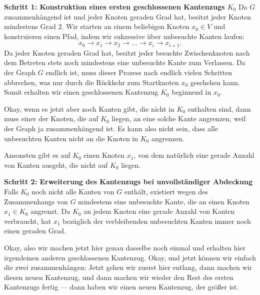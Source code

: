 \begin{math-stroke}
\begin{short-proof}
\textbf{Schritt 1: Konstruktion eines ersten geschlossenen Kantenzugs $K_0$}
Da $G$ zusammenhängend ist und jeder Knoten geraden Grad hat, besitzt jeder Knoten mindestens Grad $2$. Wir starten an einem beliebigen Knoten $x_0 \in V$ und konstruieren einen Pfad, indem wir sukzessive über unbesuchte Kanten laufen: 
\[
x_0 \to x_1 \to x_2 \to \dots \to x_i \to x_{i+1}.
\]
Da jeder Knoten geraden Grad hat, besitzt jeder besuchte Zwischenknoten nach dem Betreten stets noch mindestens eine unbesuchte Kante zum Verlassen. Da der Graph $G$ endlich ist, muss dieser Prozess nach endlich vielen Schritten abbrechen, was nur durch die Rückkehr zum Startknoten $x_0$ geschehen kann. Somit erhalten wir einen geschlossenen Kantenzug $K_0$ beginnend in $x_0$.
\end{short-proof}
\end{math-stroke}

\begin{spoken-clean}[00:11:00 - 00:13:30]
Okay, wenn es jetzt aber noch Kanten gibt, die nicht in $K_0$ enthalten sind, dann muss einer der Knoten, die auf $K_0$ liegen, an eine solche Kante angrenzen, weil der Graph ja zusammenhängend ist. Es kann also nicht sein, dass alle unbesuchten Kanten nicht an die Knoten in $K_0$ angrenzen.

Ansonsten gibt es auf $K_0$ einen Knoten $x_1$, von dem natürlich eine gerade Anzahl von Kanten ausgeht, die nicht auf $K_0$ liegen. 
\end{spoken-clean}

\begin{math-stroke}
\begin{short-proof}
\textbf{Schritt 2: Erweiterung des Kantenzugs bei unvollständiger Abdeckung}
Falls $K_0$ noch nicht alle Kanten von $G$ enthält, existiert wegen des Zusammenhangs von $G$ mindestens eine unbesuchte Kante, die an einen Knoten $x_1 \in K_0$ angrenzt. Da $K_0$ an jedem Knoten eine gerade Anzahl von Kanten verbraucht, hat $x_1$ bezüglich der verbleibenden unbesuchten Kanten immer noch einen geraden Grad.
\end{short-proof}
\end{math-stroke}

\begin{spoken-clean}[00:13:30 - 00:15:10]
Okay, also wir machen jetzt hier genau dasselbe noch einmal und erhalten hier irgendeinen anderen geschlossenen Kantenzug. Okay, und jetzt können wir einfach die zwei zusammenhängen: Jetzt gehen wir zuerst hier entlang, dann machen wir diesen neuen Kantenzug, und dann machen wir wieder den Rest des ersten Kantenzugs fertig --- dann haben wir einen neuen Kantenzug, der größer ist. 
\end{spoken-clean}

